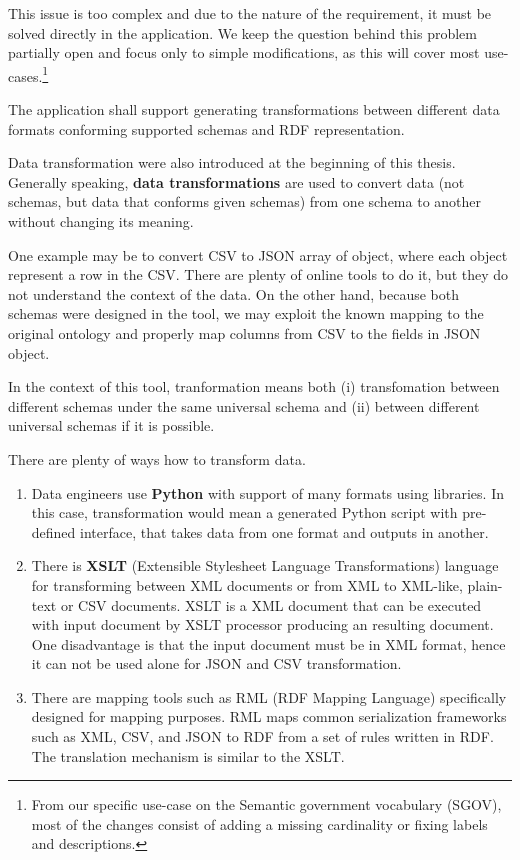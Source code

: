 This issue is too complex and due to the nature of the requirement, it must be solved directly in the application. We keep the question behind this problem partially open and focus only to simple modifications, as this will cover most use-cases.\footnote{From our specific use-case on the Semantic government vocabulary (SGOV), most of the changes consist of adding a missing cardinality or fixing labels and descriptions.}


\begin{requirement}
    The application shall support generating transformations between different data formats conforming supported schemas and RDF representation.
\end{requirement}

Data transformation were also introduced at the beginning of this thesis. Generally speaking, \textbf{data transformations} are used to convert data (not schemas, but data that conforms given schemas) from one schema to another without changing its meaning.

One example may be to convert CSV to JSON array of object, where each object represent a row in the CSV. There are plenty of online tools to do it, but they do not understand the context of the data. On the other hand, because both schemas were designed in the tool, we may exploit the known mapping to the original ontology and properly map columns from CSV to the fields in JSON object.

In the context of this tool, tranformation means both (i) transfomation between different schemas under the same universal schema and (ii) between different universal schemas if it is possible.

There are plenty of ways how to transform data.
\begin{enumerate}
    \item Data engineers use \textbf{Python} with support of many formats using libraries. In this case, transformation would mean a generated Python script with pre-defined interface, that takes data from one format and outputs in another.
    \item There is \textbf{XSLT} (Extensible Stylesheet Language Transformations) language for transforming between XML documents or from XML to XML-like, plain-text or CSV documents. XSLT is a XML document that can be executed with input document by XSLT processor producing an resulting document. One disadvantage is that the input document must be in XML format, hence it can not be used alone for JSON and CSV transformation.
    \item There are mapping tools such as RML (RDF Mapping Language) specifically designed for mapping purposes. RML maps common serialization frameworks such as XML, CSV, and JSON to RDF from a set of rules written in RDF. The translation mechanism is similar to the XSLT.
\end{enumerate}

